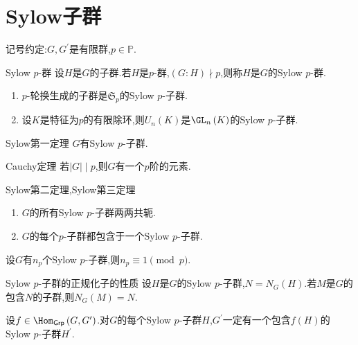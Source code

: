 \section{Sylow子群}

记号约定:$G,G^{\prime}$是有限群,$p\in\mathbb{P}$.

\begin{definition}{Sylow $p$-群}{}
	设$H$是$G$的子群.若$H$是$p$-群,$\left(G:H\right)\nmid p$,则称$H$是$G$的Sylow $p$-群.
\end{definition}

\begin{example}{}{}
	\begin{enumerate}
		\item $p$-轮换生成的子群是$\mathfrak{S}_{p}$的Sylow $p$-子群.
		\item 设$K$是特征为$p$的有限除环,则$U_{n}\left(K\right)$是$\GL_{n}\left(K\right)$的Sylow $p$-子群.
	\end{enumerate}
\end{example}

\begin{theorem}{Sylow第一定理}{}
	$G$有Sylow $p$-子群.
\end{theorem}

\begin{corollary}{Cauchy定理}{}
	若$\left|G\right|\mid p$,则$G$有一个$p$阶的元素.
\end{corollary}

\begin{theorem}{Sylow第二定理,Sylow第三定理}{}
	\begin{enumerate}
		\item $G$的所有Sylow $p$-子群两两共轭.
		\item $G$的每个$p$-子群都包含于一个Sylow $p$-子群.
	\end{enumerate}
\end{theorem}

\begin{corollary}{}{}
	设$G$有$n_{p}$个Sylow $p$-子群,则$n_{p}\equiv 1\pmod{p}$.
\end{corollary}

\begin{corollary}{Sylow $p$-子群的正规化子的性质}{}
	设$H$是$G$的Sylow $p$-子群,$N=N_{G}\left(H\right)$.若$M$是$G$的包含$N$的子群,则$N_{G}\left(M\right)=N$.
\end{corollary}

\begin{corollary}{}{}
	设$f\in\Hom_{\mathsf{Grp}}\left(G,G^{\prime}\right)$.对$G$的每个Sylow $p$-子群$H$,$G^{\prime}$一定有一个包含$f\left(H\right)$的Sylow $p$-子群$H^{\prime}$.
\end{corollary}

